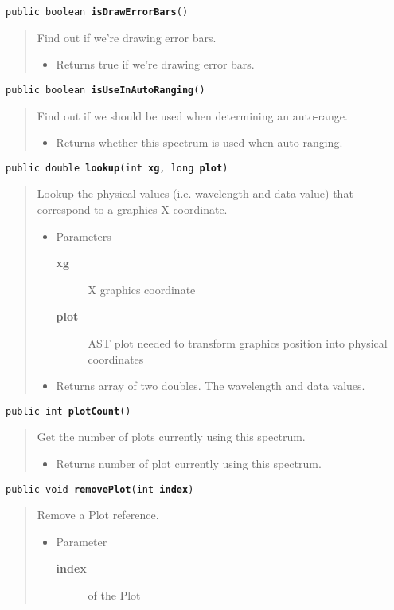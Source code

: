 \documentclass[twoside,11pt,nolof]{starlink}
\providecommand{\method}[1]{\texttt{#1}}
\newenvironment{desc}{\begin{quote}}{\end{quote}}
\begin{document}
\method{public boolean \textbf{isDrawErrorBars}()\label{l83}\label{l84}}
\begin{desc}Find out if we're drawing error bars.
\begin{itemize}
\item{Returns true if we're drawing error bars. }
\end{itemize}
\end{desc}

\method{public boolean \textbf{isUseInAutoRanging}()\label{l85}\label{l86}}
\begin{desc}Find out if we should be used when determining an auto-range.
\begin{itemize}
\item{Returns whether this spectrum is used when auto-ranging. }
\end{itemize}
\end{desc}

\method{public double \textbf{lookup}(\texttt{int} \textbf{xg}, \texttt{long} \textbf{plot})\label{l87}\label{l88}}
\begin{desc}Lookup the physical values (i.e. wavelength and data value)
 that correspond to a graphics X coordinate.
\begin{itemize}
\item{Parameters
  \begin{description}
   \item[\textbf{xg}]{X graphics coordinate}
   \item[\textbf{plot}]{AST plot needed to transform graphics position
             into physical coordinates}
  \end{description}}
\end{itemize}
\begin{itemize}
\item{Returns array of two doubles. The wavelength and data values. }
\end{itemize}
\end{desc}

\method{public int \textbf{plotCount}()\label{l89}\label{l90}}
\begin{desc}Get the number of plots currently using this spectrum.
\begin{itemize}
\item{Returns number of plot currently using this spectrum. }
\end{itemize}
\end{desc}

\method{public void \textbf{removePlot}(\texttt{int} \textbf{index})\label{l91}\label{l92}}
\begin{desc}Remove a Plot reference.
\begin{itemize}
\item{Parameter
  \begin{description}
   \item[\textbf{index}]{of the Plot}
  \end{description}}
\end{itemize}
\end{desc}
\end{document}
